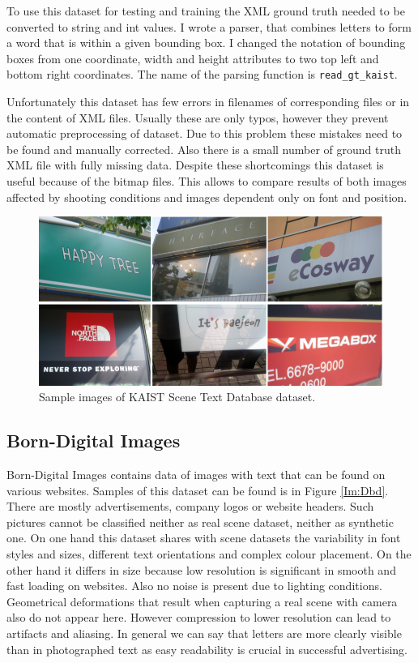 To use this dataset for testing and training the XML ground truth needed to be converted to string and int values. I wrote a parser, that combines letters to form a word that is within a given bounding box. I changed the notation of bounding boxes from one coordinate, width and height attributes to two top left and bottom right coordinates. The name of the parsing function is \texttt{read\_gt\_kaist}.

Unfortunately this dataset has few errors in filenames of corresponding files or in the content of XML files. Usually these are only typos, however they prevent automatic preprocessing of dataset. Due to this problem these mistakes need to be found and  manually corrected. Also there is a small number of ground truth XML file with fully missing data. 
Despite these shortcomings this dataset is useful because of the bitmap files. This allows to compare results of both images affected by shooting conditions and images dependent only on font and position.

\begin{figure}[hbtp]
    \centering
    \includegraphics[width=\textwidth]{obrazky/Dataset_kaist.png}
    \caption{Sample images of KAIST Scene Text Database dataset.}
    \label{Im:Dkaist}
\end{figure}

\subsection{Born-Digital Images}

Born-Digital Images contains data of images with text that can be found on various websites. Samples of this dataset can be found is in Figure \ref*{Im:Dbd}. There are mostly advertisements, company logos or website headers. Such pictures cannot be classified neither as real scene dataset, neither as synthetic one. On one hand  this dataset shares with scene datasets the variability in font styles and sizes, different text orientations and complex colour placement. On the other hand it differs in size because low resolution is significant in smooth and fast loading on websites. Also no noise is present due to lighting conditions. Geometrical deformations that result when capturing a real scene with camera also do not appear here. However compression to lower resolution can lead to artifacts and aliasing. In general we can say that letters are more clearly visible than in photographed text as easy readability is crucial in successful advertising.\cite{born-digital1}

